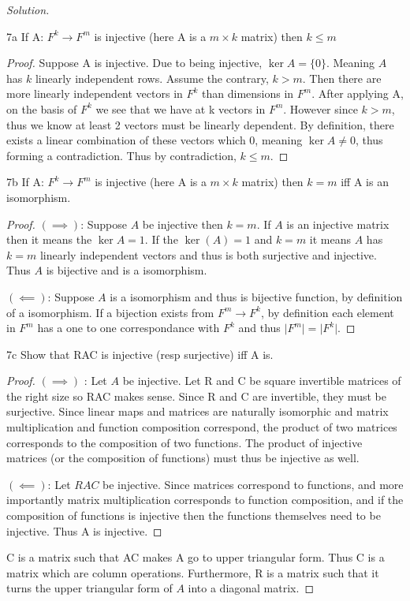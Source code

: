 \documentclass{article}
\newcommand{\abs}[1]{\lvert #1\rvert}
\newcommand{\rarr}[0]{\rightarrow}
\newenvironment{solution}
  {\renewcommand\qedsymbol{$\blacksquare$}\begin{proof}[Solution]}
  {\end{proof}}
\begin{document}
\begin{solution}
	\begin{claim}{7a}
		If A: $F^k \rarr F^m$ is injective (here A is a $m \times k$ matrix) then $k \leq m$
	\end{claim}
	\begin{proof}
		Suppose A is injective. Due to being injective, $\ker A = \{0\}$. Meaning $A$ has $k$ linearly independent rows. Assume the contrary, $k > m$. Then there are more linearly independent vectors in $F^k$ than dimensions in $F^m$. After applying A, on the basis of $F^k$ we see that we have at k vectors in $F^m$. However since $k > m$, thus we know at least 2 vectors must be linearly dependent. By definition, there exists a linear combination of these vectors which 0, meaning $\ker A \neq {0}$, thus forming a contradiction. Thus by contradiction, $k \leq m$.
	\end{proof}
	\begin{claim}{7b}
		If A: $F^k \rarr F^m$ is injective (here A is a $m \times k$ matrix) then $k = m$ iff A is an isomorphism.
	\end{claim}
	\begin{proof}
		$(\implies)$: Suppose $A$ be injective then $k = m$. If $A$ is an injective matrix then it means the $\ker{A} = 1$. If the $\ker(A) = 1$ and $k = m$ it means $A$ has $k = m$ linearly independent vectors and thus is both surjective and injective. Thus $A$ is bijective and is a isomorphism.

		$(\impliedby)$: Suppose $A$ is a isomorphism and thus is bijective function, by definition of a isomorphism. If a bijection exists from $F^m \rarr F^k$, by definition each element in $F^m$ has a one to one correspondance with $F^k$ and thus $\abs{F^m} = \abs{F^k}$.
	\end{proof}

	\begin{claim}{7c}
		Show that RAC is injective (resp surjective) iff A is.
	\end{claim}
	\begin{proof}
		$(\implies)$ : Let $A$ be injective. Let R and C be square invertible matrices of the right size so RAC makes sense. Since R and C are invertible, they must be surjective. Since linear maps and matrices are naturally isomorphic and matrix multiplication and function composition correspond, the product of two matrices corresponds to the composition of two functions.
		The product of injective matrices (or the composition of functions) must thus be injective as well.

		$(\impliedby)$: Let $RAC$ be injective. Since matrices correspond to functions, and more importantly matrix multiplication corresponds to function composition, and if the composition of functions is injective then the functions themselves need to be injective. Thus A is injective.
	\end{proof}

	
	C is a matrix such that AC makes A go to upper triangular form. Thus C is a matrix which are column operations. Furthermore, R is a matrix such that it turns the upper triangular form of $A$ into a diagonal matrix.
	
\end{solution}
\end{document}
